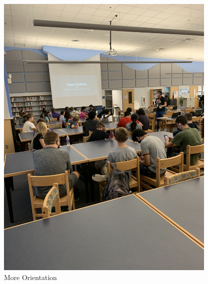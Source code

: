 \begin{figure}[ht]
\begin{minipage}[b]{.48\textwidth}
  \includegraphics[width=0.95\textwidth]{Meetings/August/08-11-21/IMG_2432 - Nathan Forrer.JPG}
  \caption{More Orientation}
  \label{fig:081121_2}
\end{minipage}
\end{figure}



